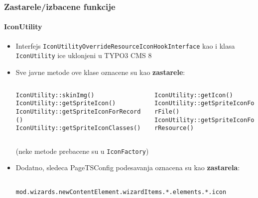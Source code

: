 \begin{frame}[fragile]
	\frametitle{Zastarele/izbacene funkcije}
	\framesubtitle{IconUtility}


	\begin{itemize}

		\item Interfejs \texttt{IconUtilityOverrideResourceIconHookInterface}\newline
			kao i klasa \texttt{IconUtility} ice uklonjeni u TYPO3 CMS 8

		\item Sve javne metode ove klase oznacene su kao \textbf{zastarele}:

		\vspace{0.2cm}

		\begin{columns}[T]
			\begin{column}{.5\textwidth}
				\tiny
					\tabto{1cm}\texttt{IconUtility::skinImg()}\newline
					\tabto{1cm}\texttt{IconUtility::getSpriteIcon()}\newline
					\tabto{1cm}\texttt{IconUtility::getSpriteIconForRecord()}\newline
					\tabto{1cm}\texttt{IconUtility::getSpriteIconClasses()}
			\end{column}
			\begin{column}{.5\textwidth}
				\vspace{-0.18cm}\tiny
					\texttt{IconUtility::getIcon()}\newline
					\texttt{IconUtility::getSpriteIconForFile()}\newline
					\texttt{IconUtility::getSpriteIconForResource()}\newline
			\end{column}
		\end{columns}

		\vspace{0.2cm}
		\normalsize

			\small
				(neke metode prebacene su u \texttt{IconFactory})
			\normalsize

		\item Dodatno, sledeca PageTSConfig podesavanja oznacena su kao \textbf{zastarela}:

			\begin{lstlisting}
				mod.wizards.newContentElement.wizardItems.*.elements.*.icon
			\end{lstlisting}

	\end{itemize}

\end{frame}

